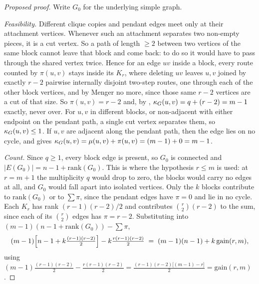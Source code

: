 \begin{proof}[Proposed proof]
Write $G_0$ for the underlying simple graph.

\emph{Feasibility.} Different clique copies and pendant edges meet only at their attachment vertices. Whenever such an attachment separates two non-empty pieces, it is a cut vertex. So a path of length $\ge 2$ between two vertices of the same block cannot leave that block and come back: to do so it would have to pass through the shared vertex twice. Hence for an edge $uv$ inside a block, every route counted by $\pi(u,v)$ stays inside its $K_r$, where deleting $uv$ leaves $u,v$ joined by exactly $r-2$ pairwise internally disjoint two-step routes, one through each of the other block vertices, and by Menger no more, since those same $r-2$ vertices are a cut of that size. So $\pi(u,v) = r-2$ and, by , $\kappa_G(u,v) = q + (r-2) = m-1$ exactly, never over. For $u,v$ in different blocks, or non-adjacent with either endpoint on the pendant path, a single cut vertex separates them, so $\kappa_G(u,v) \le 1$. If $u,v$ are adjacent along the pendant path, then the edge lies on no cycle, and  gives $\kappa_G(u,v)=\mu(u,v)+\pi(u,v)=(m-1)+0=m-1$.

\emph{Count.} Since $q \ge 1$, every block edge is present, so $G_0$ is connected and $|E(G_0)| = n - 1 + \mathrm{rank}(G_0)$. This is where the hypothesis $r \le m$ is used: at $r = m+1$ the multiplicity $q$ would drop to zero, the blocks would carry no edges at all, and $G_0$ would fall apart into isolated vertices. Only the $k$ blocks contribute to $\mathrm{rank}(G_0)$ or to $\sum \pi$, since the pendant edges have $\pi = 0$ and lie in no cycle. Each $K_r$ has rank $(r-1)(r-2)/2$ and contributes $\binom{r}{2}(r-2)$ to the sum, since each of its $\binom{r}{2}$ edges has $\pi = r-2$. Substituting into $(m-1)(n-1+\mathrm{rank}(G_0)) - \sum \pi$,
\[
    (m-1)\Bigl[n-1+k\tfrac{(r-1)(r-2)}{2}\Bigr] - k\tfrac{r(r-1)(r-2)}{2}
    \;=\; (m-1)(n-1) + k\,\mathrm{gain}(r,m),
\]
using $(m-1)\tfrac{(r-1)(r-2)}{2} - \tfrac{r(r-1)(r-2)}{2} = \tfrac{(r-1)(r-2)\bigl[(m-1)-r\bigr]}{2} = \mathrm{gain}(r,m)$.
\end{proof}

